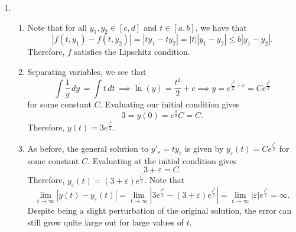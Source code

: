 \documentclass[12pt]{article}
\begin{document}
\begin{enumerate}[leftmargin=0em]
    \item
    \begin{enumerate}[leftmargin=!]
        \item 
        Note that for all $y_1,y_2\in [c,d]$ and $t\in [a,b]$, we have that
        \[|f(t,y_1)-f(t,y_2)| = |ty_{1}-ty_{2}| = |t||y_{1}-y_{2}|\leq b|y_{1}-y_{2}|.\]
        Therefore, $f$ satisfies the Lipschitz condition.

        \item
        Separating variables, we see that
        \[\int\frac{1}{y}\, dy\, = \int t\, dt\, \implies \ln(y) = \frac{t^2}{2}+c \implies y = e^{\frac{t^2}{2}+c} = Ce^{\frac{t^2}{2}}\]
        for some constant $C$. Evaluating our initial condition gives
        \[3=y(0) = e^{\frac{0}{2}}C=C.\]
        Therefore, $y(t) = 3e^{\frac{t^2}{2}}$.

        \item
        As before, the general solution to $y'_{\varepsilon} = ty_{\varepsilon}$ is given by $y_{\varepsilon}(t) = Ce^{\frac{t^2}{2}}$ for some constant $C$. Evaluating at the initial condition gives
        \[3+\varepsilon = C.\]
        Therefore, $y_{\varepsilon}(t) = (3+\varepsilon)e^{\frac{t^2}{2}}$. Note that
        \[\lim_{t \to \infty} |y(t)-y_{\varepsilon}(t)| = \lim_{t\to \infty} \left|3e^{\frac{t^2}{2}}-(3+\varepsilon)e^{\frac{t^2}{2}}\right| = \lim_{t\to \infty} \left|\varepsilon\right|e^{\frac{t^2}{2}}= \infty.\]
        Despite being a slight perturbation of the original solution, the error can still grow quite large out for large values of $t$. 
    \end{enumerate}
\end{enumerate}
\end{document}
